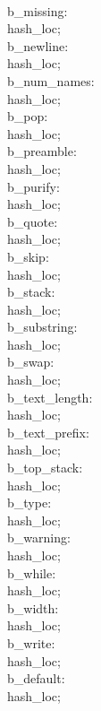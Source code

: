 \4\\{b\_missing}: \\{hash\_loc};\6
\4\\{b\_newline}: \\{hash\_loc};\6
\4\\{b\_num\_names}: \\{hash\_loc};\6
\4\\{b\_pop}: \\{hash\_loc};\6
\4\\{b\_preamble}: \\{hash\_loc};\6
\4\\{b\_purify}: \\{hash\_loc};\6
\4\\{b\_quote}: \\{hash\_loc};\6
\4\\{b\_skip}: \\{hash\_loc};\6
\4\\{b\_stack}: \\{hash\_loc};\6
\4\\{b\_substring}: \\{hash\_loc};\6
\4\\{b\_swap}: \\{hash\_loc};\6
\4\\{b\_text\_length}: \\{hash\_loc};\6
\4\\{b\_text\_prefix}: \\{hash\_loc};\6
\4\\{b\_top\_stack}: \\{hash\_loc};\6
\4\\{b\_type}: \\{hash\_loc};\6
\4\\{b\_warning}: \\{hash\_loc};\6
\4\\{b\_while}: \\{hash\_loc};\6
\4\\{b\_width}: \\{hash\_loc};\6
\4\\{b\_write}: \\{hash\_loc};\6
\4\\{b\_default}: \\{hash\_loc};\7
